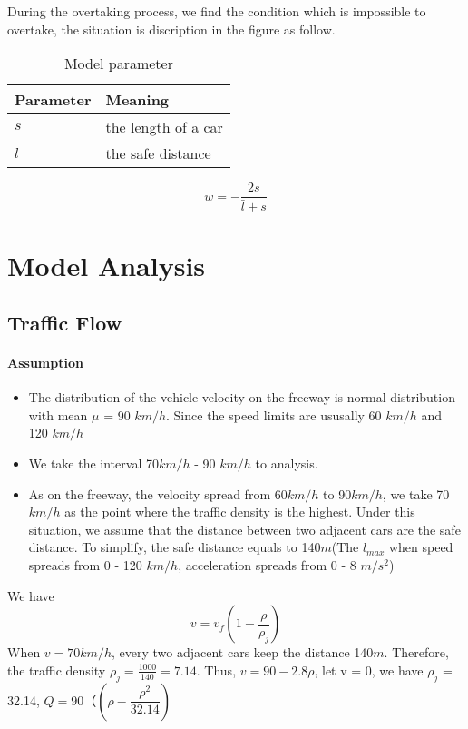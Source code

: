 During the overtaking
process, we find the condition which
is impossible to overtake, the situation
is discription in the figure as follow.

\begin{table}
\centering
\begin{tabular}{ll}
\hline
Parameter & Meaning\\
\hline
$s$ & the length of a car \\
$l$ & the safe distance \\
\hline
\end{tabular}
\caption{Model parameter}
\end{table}

\begin{equation}
w = - \frac{2s}{\bar{l} + s} 
\end{equation}
  

\section{Model Analysis}

\subsection{Traffic Flow}
\paragraph{Assumption}
\begin{itemize}
\item The distribution of the
vehicle velocity on the freeway
is normal distribution with mean
$\mu$ = 90 $km/h$. Since the speed 
limits are ususally 60 $km/h$ and 120 $km/h$
\item We take the interval 70$km/h$ - 90 $km/h$
to analysis.
\item As on the freeway, the velocity spread from
60$km/h$ to 90$km/h$, we take 70$km/h$ as the point where the traffic density is the highest.
Under this situation, we assume that the distance between two adjacent cars are the
safe distance. To simplify, the safe distance
equals to 140$m$(The $l_{max}$ when speed spreads from 0 - 120 $km/h$, acceleration spreads from 0 - 8 $m/s^2$)
\end{itemize}

We have 
\begin{equation}
v = v_f(1 - \frac{\rho}{\rho_j})
\end{equation}
When $v = 70km/h$, every two adjacent cars keep the distance 140$m$. Therefore,
the traffic density 
$\rho_j = \frac{1000}{140} = 7.14$.
Thus, $v = 90 - 2.8 \rho$,
let v = 0, we have
$\rho_j$ = 32.14,
$Q = 90（(\rho - \dfrac{\rho ^2}{32.14})$

